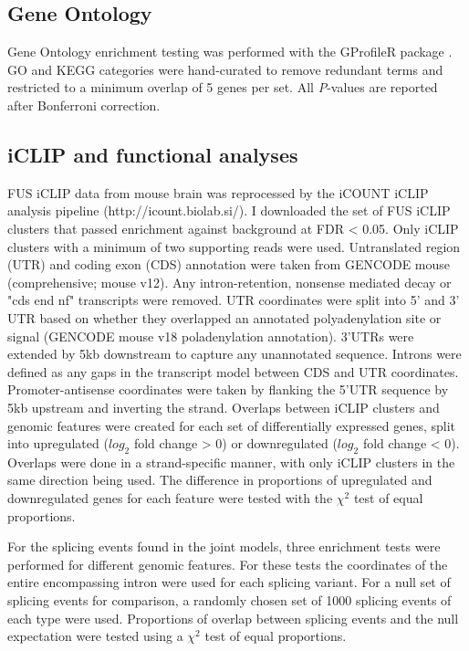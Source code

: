 \subsection{Gene Ontology}
Gene Ontology enrichment testing was performed with the GProfileR package \citep{Reimand2016}. 
GO and KEGG categories were hand-curated to remove redundant terms and restricted to a minimum overlap of 5 genes per set. 
All \textit{P}-values  are reported after Bonferroni correction. 

\subsection{iCLIP and functional analyses}

FUS iCLIP data from mouse brain \citep{Rogelj2012} was reprocessed by the iCOUNT iCLIP analysis pipeline (http://icount.biolab.si/). 
I downloaded the set of FUS iCLIP clusters that passed enrichment against background at FDR < 0.05. 
Only iCLIP clusters with a minimum of two supporting reads were used. 
Untranslated region (UTR) and coding exon (CDS) annotation were taken from GENCODE mouse (comprehensive; mouse v12). Any intron-retention, nonsense mediated decay or "cds end nf" transcripts were removed. 
UTR coordinates were split into 5' and 3' UTR based on whether they overlapped an annotated polyadenylation site or signal (GENCODE mouse v18 poladenylation annotation). 
3'UTRs were extended by 5kb downstream to capture any unannotated sequence.
Introns were defined as any gaps in the transcript model between CDS and UTR coordinates.
Promoter-antisense coordinates were taken by flanking the 5'UTR sequence by 5kb upstream and inverting the strand.
Overlaps between iCLIP clusters and genomic features were created for each set of differentially expressed genes, split into upregulated ($log_2$ fold change > 0) or downregulated ($log_2$ fold change < 0). 
Overlaps were done in a strand-specific manner, with only iCLIP clusters in the same direction being used.
The difference in proportions of upregulated and downregulated genes for each feature were tested with the $\chi^2$ test of equal proportions.

For the splicing events found in the joint models, three enrichment tests were performed for different genomic features. 
For these tests the coordinates of the entire encompassing intron were used for each splicing variant.
For a null set of splicing events for comparison, a randomly chosen set of 1000 splicing events of each type were used.
Proportions of overlap between splicing events and the null expectation were tested using a $\chi^2$ test of equal proportions.

